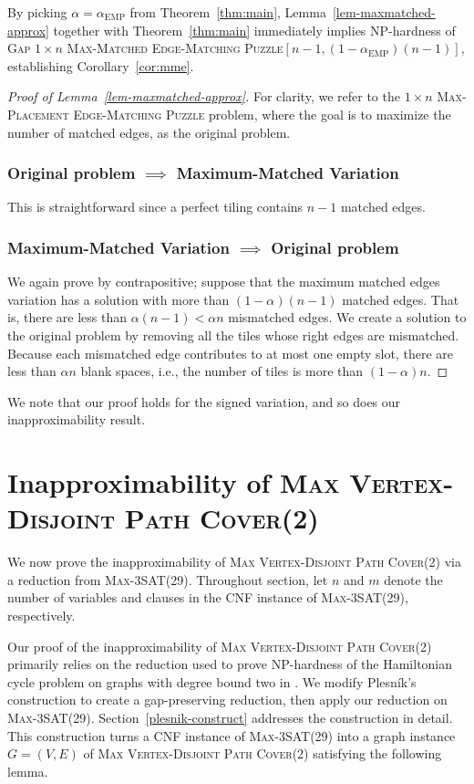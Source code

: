 \documentclass[11pt]{article}
\def\EMP{\mathrm{EMP}}
\def\Gap#1{\textsc{Gap} #1}
\begin{document}
By picking $\alpha = \alpha_{\EMP}$ from Theorem~\ref{thm:main}, Lemma~\ref{lem-maxmatched-approx} together with Theorem~\ref{thm:main} immediately implies NP-hardness of \Gap{\textsc{$1 \times n$ Max-Matched Edge-Matching Puzzle}}$[n-1, (1-\alpha_{\EMP})(n-1)]$, establishing Corollary~\ref{cor:mme}.

\begin{proof}[Proof of Lemma~\ref{lem-maxmatched-approx}]
For clarity, we refer to the \textsc{$1 \times n$ Max-Placement Edge-Matching Puzzle} problem, where the goal is to maximize the number of matched edges, as the original problem.

\subsubsection*{Original problem $\implies$ Maximum-Matched Variation}
This is straightforward since a perfect tiling contains $n - 1$ matched edges.

\subsubsection*{Maximum-Matched Variation $\implies$ Original problem}
We again prove by contrapositive; suppose that the maximum matched edges variation has a solution with more than $(1-\alpha)(n-1)$ matched edges. That is, there are less than $\alpha(n-1) < \alpha n$ mismatched edges. We create a solution to the original problem by removing all the tiles whose right edges are mismatched. Because each mismatched edge contributes to at most one empty slot, there are less than $\alpha n$ blank spaces, i.e., the number of tiles is more than $(1 - \alpha) n$.
\end{proof}

We note that our proof holds for the signed variation, and so does our inapproximability result.

\section{Inapproximability of \textsc{Max Vertex-Disjoint Path Cover(2)}} \label{sec:mvdpc}

We now prove the inapproximability of \textsc{Max Vertex-Disjoint Path Cover(2)} via a reduction from \textsc{Max-3SAT(29)}. Throughout section, let $n$ and $m$ denote the number of variables and clauses in the CNF instance of \textsc{Max-3SAT(29)}, respectively.

Our proof of the inapproximability of \textsc{Max Vertex-Disjoint Path Cover(2)} primarily relies on the reduction used to prove NP-hardness of the Hamiltonian cycle problem on graphs with degree bound two in \cite{plesnik}. We modify Plesn{\'i}k's construction to create a gap-preserving reduction, then apply our reduction on \textsc{Max-3SAT(29)}. Section~\ref{plesnik-construct} addresses the construction in detail. This construction turns a CNF instance of \textsc{Max-3SAT(29)} into a graph instance $G=(V, E)$ of \textsc{Max Vertex-Disjoint Path Cover(2)} satisfying the following lemma.
\end{document}
